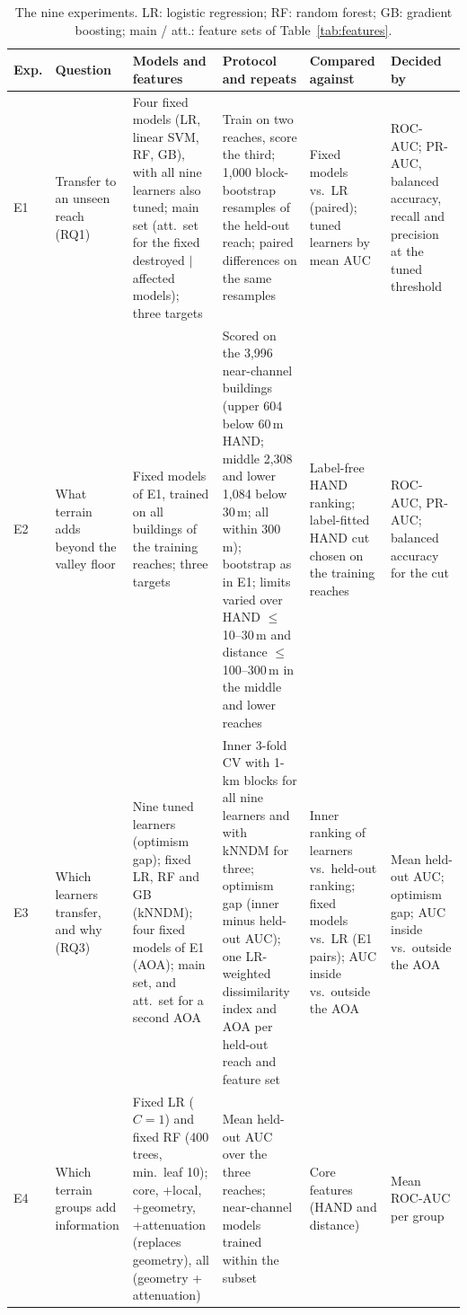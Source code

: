\documentclass[journal,a4paper]{IEEEtran}
\begin{document}
\begin{table}[!t]
\centering\scriptsize
\setlength{\tabcolsep}{4pt}
\renewcommand{\arraystretch}{1.08}
\caption{The nine experiments. LR: logistic regression; RF: random forest; GB: gradient boosting; main / att.: feature sets of Table~\ref{tab:features}.}\label{tab:design}
\begin{tabularx}{\textwidth}{@{}lL{2.5cm}L{3.6cm}YL{2.8cm}L{2.8cm}@{}}
\toprule
\textbf{Exp.} & \textbf{Question} & \textbf{Models and features} & \textbf{Protocol and repeats} & \textbf{Compared against} & \textbf{Decided by}\\
\midrule
E1 & Transfer to an unseen reach (RQ1) & Four fixed models (LR, linear SVM, RF, GB), with all nine learners also tuned; main set (att.\ set for the fixed destroyed $\mid$ affected models); three targets & Train on two reaches, score the third; 1,000 block-bootstrap resamples of the held-out reach; paired differences on the same resamples & Fixed models vs.\ LR (paired); tuned learners by mean AUC & ROC-AUC; PR-AUC, balanced accuracy, recall and precision at the tuned threshold\\[2pt]
E2 & What terrain adds beyond the valley floor & Fixed models of E1, trained on all buildings of the training reaches; three targets & Scored on the 3,996 near-channel buildings (upper 604 below 60\,m HAND; middle 2,308 and lower 1,084 below 30\,m; all within 300\,m); bootstrap as in E1; limits varied over HAND $\leq$ 10--30\,m and distance $\leq$ 100--300\,m in the middle and lower reaches & Label-free HAND ranking; label-fitted HAND cut chosen on the training reaches & ROC-AUC, PR-AUC; balanced accuracy for the cut\\[2pt]
E3 & Which learners transfer, and why (RQ3) & Nine tuned learners (optimism gap); fixed LR, RF and GB (kNNDM); four fixed models of E1 (AOA); main set, and att.\ set for a second AOA & Inner 3-fold CV with 1-km blocks for all nine learners and with kNNDM for three; optimism gap (inner minus held-out AUC); one LR-weighted dissimilarity index and AOA per held-out reach and feature set & Inner ranking of learners vs.\ held-out ranking; fixed models vs.\ LR (E1 pairs); AUC inside vs.\ outside the AOA & Mean held-out AUC; optimism gap; AUC inside vs.\ outside the AOA\\[2pt]
E4 & Which terrain groups add information & Fixed LR ($C = 1$) and fixed RF (400 trees, min.\ leaf 10); core, +local, +geometry, +attenuation (replaces geometry), all (geometry + attenuation) & Mean held-out AUC over the three reaches; near-channel models trained within the subset & Core features (HAND and distance) & Mean ROC-AUC per group\\[2pt]

\end{tabularx}
\end{table}
\end{document}
